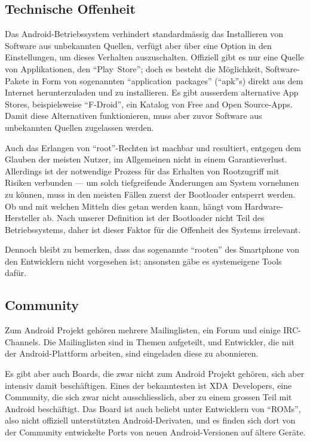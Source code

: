 \subsection{Technische Offenheit}
Das \mbox{Android-Betriebssystem} verhindert standardmässig das Installieren von Software aus unbekannten Quellen, verfügt aber über eine Option in den Einstellungen, um dieses Verhalten auszuschalten. Offiziell gibt es nur eine Quelle von Applikationen, den ``\mbox{Play Store}''; doch es besteht die Möglichkeit, \mbox{Software-Pakete} in Form von sogenannten ``\mbox{application packages}'' (``apk''s) direkt aus dem Internet herunterzuladen und zu installieren. Es gibt ausserdem alternative App Stores, beispielsweise ``\mbox{F-Droid}'', ein Katalog von Free and Open \mbox{Source-Apps}\thinspace\cite{online:f-droid}. Damit diese Alternativen funktionieren, muss aber zuvor Software aus unbekannten Quellen zugelassen werden.

Auch das Erlangen von \mbox{``root''-Rechten} ist machbar und resultiert, entgegen dem Glauben der meisten Nutzer, im Allgemeinen nicht in einem Garantieverlust\thinspace\cite{online:xda-rooting-warranty}. Allerdings ist der notwendige Prozess für das Erhalten von Rootzugriff mit Risiken verbunden --- um solch tiefgreifende Änderungen am System vornehmen zu können, muss in den meisten Fällen zuerst der Bootloader entsperrt werden. 
Ob und mit welchen Mitteln dies getan werden kann, hängt vom Hardware-Hersteller ab\thinspace\cite{online:apu-what-is-unlocking}. Nach unserer Definition ist der Bootloader nicht Teil des Betriebssystems, daher ist dieser Faktor für die Offenheit des Systems irrelevant.

Dennoch bleibt zu bemerken, dass das sogenannte ``rooten'' des Smartphone von den Entwicklern nicht vorgesehen ist; ansonsten gäbe es systemeigene Tools dafür.
\newline

\subsection{Community}
Zum Android Projekt gehören mehrere Mailinglisten, ein Forum und einige \mbox{IRC-Channels}\thinspace\cite{online:android-community}. Die Mailinglisten sind in Themen aufgeteilt, und Entwickler, die mit der \mbox{Android-Plattform} arbeiten, sind eingeladen diese zu abonnieren\thinspace\cite{online:android-community}.

Es gibt aber auch Boards, die zwar nicht zum Android Projekt gehören, sich aber intensiv damit beschäftigen. Eines der bekanntesten ist \mbox{XDA Developers}\thinspace\cite{online:xda-developers}, eine Community, die sich zwar nicht ausschliesslich, aber zu einem grossen Teil mit Android beschäftigt. Das Board ist auch beliebt unter Entwicklern von ``ROMs'', also nicht offiziell unterstützten Android-Derivaten, und es finden sich dort von der Community entwickelte Ports von neuen Android-Versionen auf ältere Geräte.
\newline

